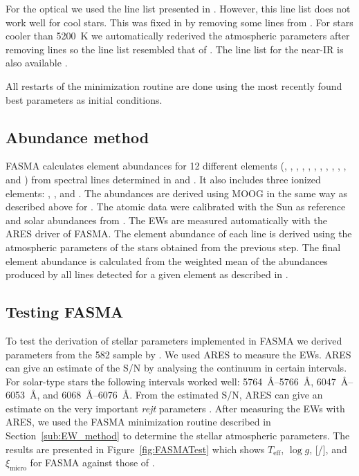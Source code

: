 \documentclass{aa}
\begin{document}
For the optical we used the line list presented in \citet{Sousa2008a}. However,
this line list does not work well for cool stars. This was fixed in
\citet{Tsantaki2013} by removing some lines from \citet{Sousa2008a}. For stars
cooler than \SI{5200}{K} we automatically rederived the atmospheric parameters
after removing lines so the line list resembled that of \citet{Tsantaki2013}.
The line list for the near-IR is also available \citep{Andreasen2016}.

All restarts of the minimization routine are done using the most recently found
best parameters as initial conditions.


\subsection{Abundance method}
\label{sub:Abundance_method}

FASMA calculates element abundances for 12 different elements (,
, , , , , ,
, , , , and ) from spectral
lines determined in \citet{Neves2009} and \citet{Adibekyan2012}. It also
includes three ionized elements: , , and .
The abundances are derived using MOOG in the same way as described above for
. The atomic data were calibrated with the Sun as reference and solar
abundances from \citet{Anders1989}. The EWs are measured automatically with the
ARES driver of FASMA. The element abundance of each line is derived using the
atmospheric parameters of the stars obtained from the previous step. The final
element abundance is calculated from the weighted mean of the abundances
produced by all lines detected for a given element as described in
\citet{Adibekyan2015b}.


\subsection{Testing FASMA}
\label{sub:Testing_FASMA}

To test the derivation of stellar parameters implemented in FASMA we derived
parameters from the 582 sample by \citet{Sousa2011}. We used ARES to measure the
EWs. ARES can give an estimate of the S/N by analysing the continuum in certain
intervals. For solar-type stars the following intervals worked well:
\SIrange{5764}{5766}{\angstrom}, \SIrange{6047}{6053}{\angstrom}, and
\SIrange{6068}{6076}{\angstrom}. From the estimated S/N, ARES can give an
estimate on the very important \emph{rejt} parameters
\citep[see][for more information]{Sousa2015a}. After measuring the EWs with ARES,
we used the FASMA minimization routine described in Section~\ref{sub:EW_method}
to determine the stellar atmospheric parameters. The results are presented in
Figure~\ref{fig:FASMATest} which shows $T_\mathrm{eff}$, $\log g$,
[/], and $\xi_\mathrm{micro}$ for FASMA against those of
\citet{Sousa2011}.
\end{document}
